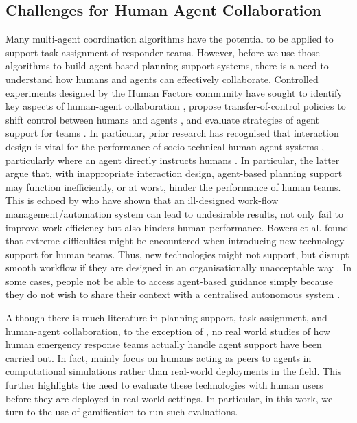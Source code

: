 \subsection{Challenges for Human Agent Collaboration}\label{sec:challenges}
Many multi-agent coordination algorithms have the potential to be applied to support task assignment of responder teams. However, before we use those algorithms to build agent-based planning support systems, there is a need to understand how humans and agents can effectively collaborate.  Controlled experiments designed by the Human Factors community have sought to identify key aspects of human-agent collaboration \cite{Bradshaw2011,Cooke2006,Sukthankar,Wagner2004}, propose transfer-of-control policies to shift control between humans and agents \cite{scerri:etal:2005},  and evaluate strategies of agent support for teams \cite{Lenox2000}. In particular, prior research has recognised that interaction design is vital for the performance of socio-technical human-agent systems \cite{Rachlin1997}, particularly where an agent directly instructs humans \cite{Moran2013}. In particular, the latter argue that, with inappropriate interaction design, agent-based planning support may function inefficiently, or at worst, hinder the performance of human teams.  This is echoed by \cite{Bowers1994} who have shown that an ill-designed work-flow management/automation system can lead to undesirable results, not only fail to improve work efficiency but also hinders human performance. Bowers et al. found that extreme difficulties might be encountered when introducing new technology support for human teams. Thus,  new technologies might not support, but  disrupt smooth workflow if they are designed in an organisationally unacceptable way \cite{Abbott1994}. In some cases, people not be able to access agent-based guidance simply because they do not wish to share their context with a centralised autonomous system \cite{Wirz10_HumanCom}.

Although there is much literature in planning support, task assignment, and human-agent collaboration, to the exception of \cite{scerri:etal:2003,schurr2005defacto}, no real world studies of how human emergency response teams  actually handle agent support  have been carried out.  In fact, \cite{scerri:etal:2003,schurr2005defacto} mainly focus on humans acting as peers to agents in computational simulations rather than real-world deployments in the field. This further highlights the need to evaluate these technologies with human users before they are deployed in real-world settings. In particular, in this work, we turn to the use of gamification to run such evaluations. 

